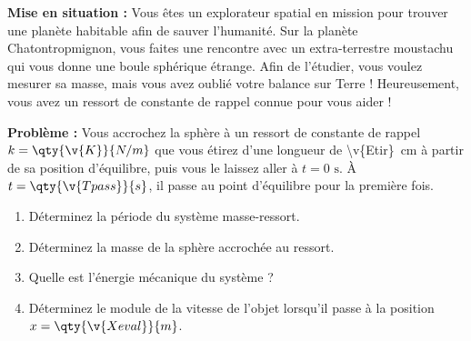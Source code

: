 
\textbf{Mise en situation :} Vous êtes un explorateur spatial en mission pour trouver une planète habitable afin de sauver l'humanité. Sur la planète Chatontropmignon, vous faites une rencontre avec un extra-terrestre moustachu qui vous donne une boule sphérique étrange. Afin de l'étudier, vous voulez mesurer sa masse, mais vous avez oublié votre balance sur Terre ! Heureusement, vous avez un ressort de constante de rappel connue pour vous aider !

\textbf{Problème :} Vous accrochez la sphère à un ressort de constante de rappel $k = \qty{\v{K}}{N/m}$ que vous étirez d'une longueur de \qty{\v{Etir}}{cm} à partir de sa position d'équilibre, puis vous le laissez aller à $t = 0\text{ s}$. À $t = \qty{\v{Tpass}}{s}$, il passe au point d'équilibre pour la première fois.

\begin{enumerate}[label=\alph*)]
    \item Déterminez la période du système masse-ressort.
    \item Déterminez la masse de la sphère accrochée au ressort.
    \item Quelle est l'énergie mécanique du système ?
    \item Déterminez le module de la vitesse de l'objet lorsqu'il passe à la position $x = \qty{\v{Xeval}}{m}$.
\end{enumerate}